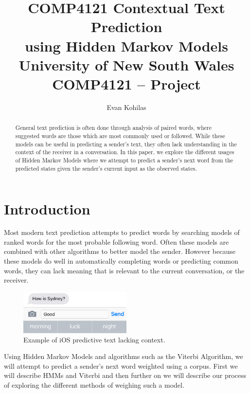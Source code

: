 \documentclass{article}
\title{COMP4121}
\begin{document}
\title{
    {\textbf{Contextual Text Prediction\\using Hidden Markov Models}}\\
    {University of New South Wales}\\
    {COMP4121 -- Project}
}
\author{Evan Kohilas}
\date{}
\maketitle

\begin{abstract}
    General text prediction is often done through analysis of paired words,
    where suggested words are those which are most commonly used or followed.
    While these models can be useful in predicting a sender's text, they often
    lack understanding in the context of the receiver in a conversation. In this
    paper, we explore the different usages of Hidden Markov Models where we
    attempt to predict a sender's next word from the predicted states given the
    sender's current input as the observed states.
\end{abstract}

\section{Introduction}
Most modern text prediction attempts to predict words by searching models of
ranked words for the most probable following word. Often these models are
combined with other algorithms to better model the sender. However because these
models do well in automatically completing words or predicting common words,
they can lack meaning that is relevant to the current conversation, or the
receiver.

\begin{figure}[H]
    \centering
    \includegraphics[width=0.5\textwidth]{sydney.png}
    \caption{Example of iOS predictive text lacking context.}
\end{figure}

Using Hidden Markov Models and algorithms such as the Viterbi Algorithm,
we will attempt to predict a sender's next word weighted using a corpus.
First we will describe HMMs and Viterbi and then further on we will describe our
process of exploring the different methods of weighing such a model.
\end{document}
